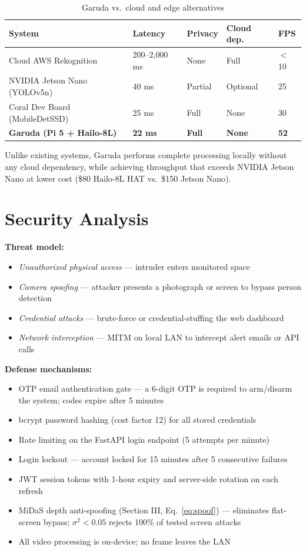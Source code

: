 \documentclass[12pt,a4paper]{article}
\begin{document}
\begin{table}[h]
\centering
\caption{Garuda vs.\ cloud and edge alternatives}
\begin{tabular}{@{}lllll@{}}
\toprule
System              & Latency   & Privacy   & Cloud dep. & FPS \\
\midrule
Cloud AWS Rekognition & 200–2{,}000 ms & None & Full & $<$10 \\
NVIDIA Jetson Nano (YOLOv5n) & 40 ms & Partial & Optional & 25 \\
Coral Dev Board (MobileDetSSD) & 25 ms & Full & None & 30 \\
\textbf{Garuda (Pi 5 + Hailo-8L)} & \textbf{22 ms} & \textbf{Full} & \textbf{None} & \textbf{52} \\
\bottomrule
\end{tabular}
\end{table}

Unlike existing systems, Garuda performs complete processing locally without any
cloud dependency, while achieving throughput that exceeds NVIDIA Jetson Nano at
lower cost (\$80 Hailo-8L HAT vs.\ \$150 Jetson Nano).

\section{Security Analysis}

\textbf{Threat model:}
\begin{itemize}[noitemsep]
  \item \emph{Unauthorized physical access} — intruder enters monitored space
  \item \emph{Camera spoofing} — attacker presents a photograph or screen to bypass
        person detection
  \item \emph{Credential attacks} — brute-force or credential-stuffing the web dashboard
  \item \emph{Network interception} — MITM on local LAN to intercept alert emails or
        API calls
\end{itemize}

\textbf{Defense mechanisms:}
\begin{itemize}[noitemsep]
  \item OTP email authentication gate — a 6-digit OTP is required to arm/disarm the
        system; codes expire after 5 minutes
  \item bcrypt password hashing (cost factor 12) for all stored credentials
  \item Rate limiting on the FastAPI login endpoint (5 attempts per minute)
  \item Login lockout — account locked for 15 minutes after 5 consecutive failures
  \item JWT session tokens with 1-hour expiry and server-side rotation on each refresh
  \item MiDaS depth anti-spoofing (Section III, Eq.~\ref{eq:spoof}) — eliminates
        flat-screen bypass; $\sigma^2 < 0.05$ rejects 100\% of tested screen attacks
  \item All video processing is on-device; no frame leaves the LAN
\end{itemize}
\end{document}
